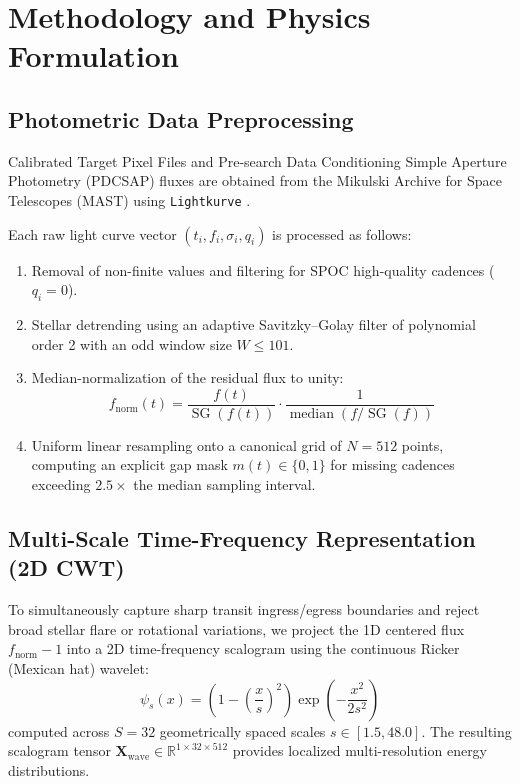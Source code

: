 \documentclass[11pt,a4paper]{article}
\begin{document}
\section{Methodology and Physics Formulation}

\subsection{Photometric Data Preprocessing}

Calibrated Target Pixel Files and Pre-search Data Conditioning Simple Aperture Photometry (PDCSAP) fluxes are obtained from the Mikulski Archive for Space Telescopes (MAST) using \texttt{Lightkurve} \citep{lightkurve2018collaboration}. 

Each raw light curve vector $(t_i, f_i, \sigma_i, q_i)$ is processed as follows:
\begin{enumerate}
    \item Removal of non-finite values and filtering for SPOC high-quality cadences ($q_i = 0$).
    \item Stellar detrending using an adaptive Savitzky--Golay filter of polynomial order 2 with an odd window size $W \le 101$.
    \item Median-normalization of the residual flux to unity:
    \begin{equation}
        f_{\text{norm}}(t) = \frac{f(t)}{\operatorname{SG}(f(t))} \cdot \frac{1}{\operatorname{median}(f/\operatorname{SG}(f))}
    \end{equation}
    \item Uniform linear resampling onto a canonical grid of $N = 512$ points, computing an explicit gap mask $m(t) \in \{0, 1\}$ for missing cadences exceeding $2.5\times$ the median sampling interval.
\end{enumerate}

\subsection{Multi-Scale Time-Frequency Representation (2D CWT)}

To simultaneously capture sharp transit ingress/egress boundaries and reject broad stellar flare or rotational variations, we project the 1D centered flux $f_{\text{norm}} - 1$ into a 2D time-frequency scalogram using the continuous Ricker (Mexican hat) wavelet:
\begin{equation}
    \psi_s(x) = \left(1 - \left(\frac{x}{s}\right)^2\right) \exp\left(-\frac{x^2}{2s^2}\right)
\end{equation}
computed across $S = 32$ geometrically spaced scales $s \in [1.5, 48.0]$. The resulting scalogram tensor $\mathbf{X}_{\text{wave}} \in \mathbb{R}^{1 \times 32 \times 512}$ provides localized multi-resolution energy distributions.
\end{document}
